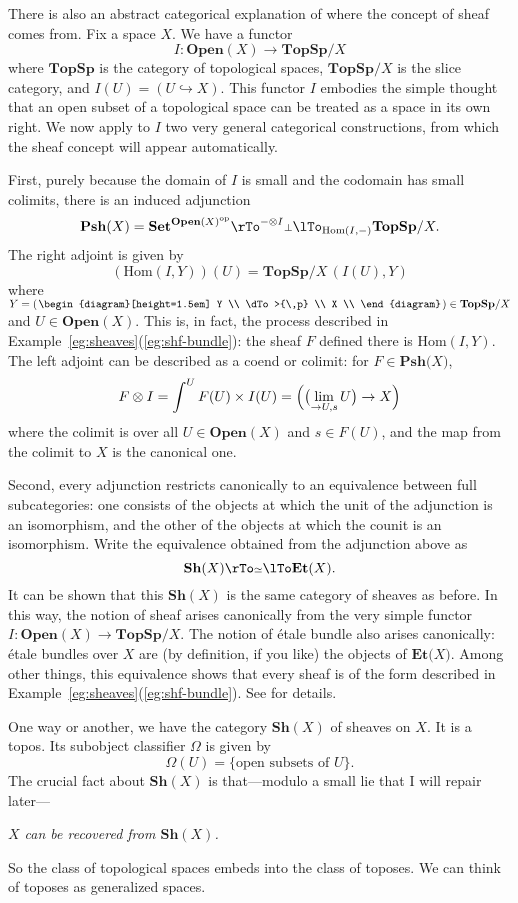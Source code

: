 \documentclass{article}
\newcommand{\dashbk}{-}
\newcommand{\fcat}[1]{\mathbf{#1}}
\newcommand{\Hom}{\mathrm{Hom}}
\newcommand{\op}{\mathrm{op}}
\newcommand{\Set}{\fcat{Set}}
\newcommand{\vslob}[3]
	{\left.
	\begin{diagram}[height=1.5em]
	#1		\\
	\dTo>{\,#2}	\\
	#3		\\
	\end{diagram}
	\right.}
\newcommand{\eqv}{\simeq}
\newcommand{\Colt}[1]{{\displaystyle\lim_{\rightarrow #1}}\,}
\newcommand{\slogan}[1]{\begin{center}\it #1\end{center}}
\newcommand{\Pshf}[1]{\fcat{Psh}{#1}}
\newcommand{\Sh}{\fcat{Sh}}
\newcommand{\Et}[1]{\fcat{Et}{#1}}
\newcommand{\Open}{\fcat{Open}}
\newcommand{\TopSp}{\fcat{TopSp}}
\newcommand{\incl}{\hookrightarrow}
\newcommand{\dbot}{{\scriptstyle\bot}}
\newcommand{\deqv}{{\scriptstyle\eqv}}
\newcommand{\cln}{\colon}
\begin{document}
There is also an abstract categorical explanation of where the concept of
sheaf comes from.  Fix a space $X$.  We have a functor
\[
I\cln \Open(X) \to \TopSp/X
\]
where $\TopSp$ is the category of topological spaces, $\TopSp/X$ is the slice
category, and $I(U) = (U \incl X)$.  This functor $I$ embodies the simple
thought that an open subset of a topological space can be treated as a space
in its own right.  We now apply to $I$ two very general categorical
constructions, from which the sheaf concept will appear automatically.

First, purely because the domain of $I$ is small and the codomain has small
colimits, there is an induced adjunction
\[
\Pshf(X) = \Set^{\Open(X)^\op}
\pile{\rTo^{\dashbk \otimes I}\\ \dbot\\ \lTo_{\Hom(I, \dashbk)}}
\TopSp/X.
\]
The right adjoint is given by
\[
(\Hom(I, Y))(U)
=
\TopSp/X
\,
(I(U), Y)
\]
where $Y = \left(\vslob{Y}{p}{X}\right) \in \TopSp/X$ and $U \in \Open(X)$.
This is, in fact, the process described in
Example~\ref{eg:sheaves}(\ref{eg:shf-bundle}): the sheaf $F$ defined there is
$\Hom(I, Y)$.  The left adjoint can be described as a coend or colimit: for $F
\in \Pshf(X)$,
\[
F \otimes I     
= 
\int^U F(U) \times I(U) 
=
\Bigl(
\bigl(
\Colt{U, s}
U
\bigr)
\to
X
\Bigr)
\]
where the colimit is over all $U \in \Open(X)$ and $s \in F(U)$, and the
map from the colimit to $X$ is the canonical one.

Second, every adjunction restricts%
\label{p:adjn-eqv}
canonically to an equivalence between full subcategories: one consists of the
objects at which the unit of the adjunction is an isomorphism, and the other
of the objects at which the counit is an isomorphism.  Write the
equivalence obtained from the adjunction above as 
\[
\Sh(X) 
\pile{\rTo\\ \deqv\\ \lTo}
\Et(X).
\]
It can be shown that this $\Sh(X)$ is the same category of sheaves as before.
In this way, the notion of sheaf arises canonically from the very simple
functor $I\cln \Open(X) \to \TopSp/X$.  The notion of \'etale bundle also
arises canonically: \'etale bundles over $X$ are (by definition, if you like)
the objects of $\Et(X)$.  Among other things, this equivalence shows that
every sheaf is of the form described in
Example~\ref{eg:sheaves}(\ref{eg:shf-bundle}).  See \citet{MaMo} for details.

One way or another, we have the category $\Sh(X)$ of sheaves on $X$.  It is a
topos.  Its subobject classifier $\Omega$ is given by
\[
\Omega(U) 
=
\{
\textrm{open subsets of } U
\}.
\]
The crucial fact about $\Sh(X)$ is that---modulo a small lie that I will
repair later---
% 
\slogan{$X$ can be recovered from $\Sh(X)$.}
% 
So the class of topological spaces embeds into the class of toposes.  We can
think of toposes as generalized spaces.
\end{document}
